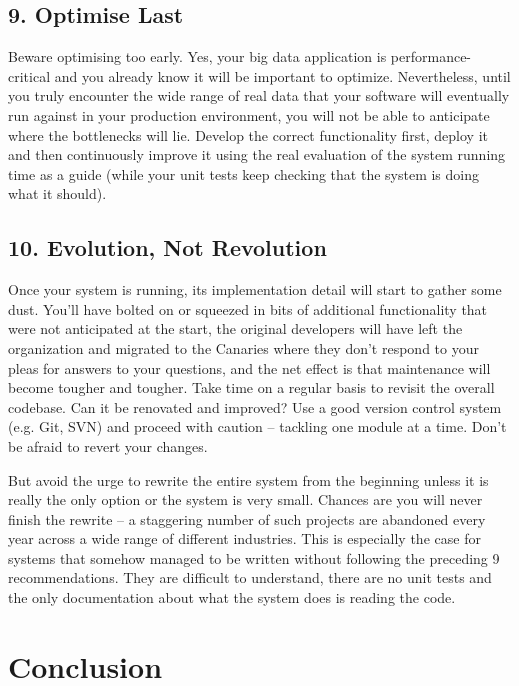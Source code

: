\documentclass{bmcart}
\begin{document}
\subsection*{9. Optimise Last}

Beware optimising too early. Yes, your big data application is performance-critical and you already know it will be important to optimize. Nevertheless, until you truly encounter the wide range of real data that your software will eventually run against in your production environment, you will not be able to anticipate where the bottlenecks will lie. Develop the correct functionality first, deploy it and then continuously improve it using the real evaluation of the system running time as a guide (while your unit tests keep checking that the system is doing what it should). 

\subsection*{10. Evolution, Not Revolution}

Once your system is running, its implementation detail will start to gather some dust. You'll have bolted on or squeezed in bits of additional functionality that were not anticipated at the start, the original developers will have left the organization and migrated to the Canaries where they don't respond to your pleas for answers to your questions, and the net effect is that maintenance will become tougher and tougher. Take time on a regular basis to revisit the overall codebase. Can it be renovated and improved? Use a good version control system (e.g. Git, SVN) and proceed with caution -- tackling one module at a time. Don't be afraid to revert your changes. 

But avoid the urge to rewrite the entire system from the beginning unless it is really the only option or the system is very small. Chances are you will never finish the rewrite -- a staggering number of such projects are abandoned every year across a wide range of different industries. This is especially the case for systems that somehow managed to be written without following the preceding 9 recommendations. They are difficult to understand, there are no unit tests and the only documentation about what the system does is reading the code. 

\section*{Conclusion}
\end{document}

